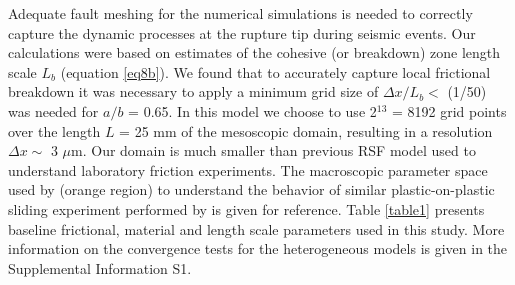 \documentclass[preprint,1p, 10pt,authoryear]{elsarticle}
\begin{document}
Adequate fault meshing for the numerical simulations is needed to correctly capture the dynamic processes at the rupture tip during seismic events. Our calculations were based on estimates of the cohesive (or breakdown) zone length scale $L_{b}$ (equation \eqref{eq8b}). We found that to accurately capture local frictional breakdown it was necessary to apply a minimum grid size of $\Delta x/L_{b} <$ (1/50) was needed for $a/b$ = 0.65.  In this model we choose to use 2$^{13}$ = 8192 grid points over the length $L$ = 25 mm of the mesoscopic domain, resulting in a resolution $\Delta x \sim$  3 $\mu$m. Our domain is much smaller than previous RSF model used to understand laboratory friction experiments. The macroscopic parameter space used by \citet{Kaneko2016} (orange  region) to understand the behavior of similar plastic-on-plastic sliding experiment performed by \citet{Latour2013} is given for reference. Table \ref{table1} presents baseline frictional, material and length scale parameters used in this study. More information on the convergence tests for the heterogeneous models is given in the Supplemental Information S1.
\end{document}
